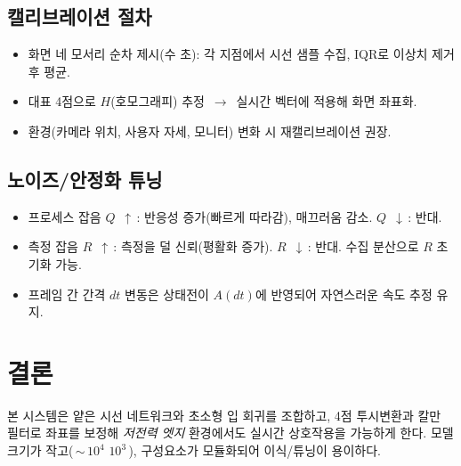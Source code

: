 \documentclass[10pt,a4paper]{article}
\begin{document}
\subsection{캘리브레이션 절차}
\begin{itemize}
  \item 화면 네 모서리 순차 제시(수 초): 각 지점에서 시선 샘플 수집, IQR로 이상치 제거 후 평균.
  \item 대표 4점으로 $H$(호모그래피) 추정 \,$\to$\, 실시간 벡터에 적용해 화면 좌표화.
  \item 환경(카메라 위치, 사용자 자세, 모니터) 변화 시 재캘리브레이션 권장.
\end{itemize}

\subsection{노이즈/안정화 튜닝}
\begin{itemize}
  \item 프로세스 잡음 $Q$ \,$\uparrow$\,: 반응성 증가(빠르게 따라감), 매끄러움 감소. $Q$ \,$\downarrow$\,: 반대.
  \item 측정 잡음 $R$ \,$\uparrow$\,: 측정을 덜 신뢰(평활화 증가). $R$ \,$\downarrow$\,: 반대. 수집 분산으로 $R$ 초기화 가능.
  \item 프레임 간 간격 $dt$ 변동은 상태전이 $A(dt)$에 반영되어 자연스러운 속도 추정 유지.
\end{itemize}

\section{결론}
본 시스템은 얕은 시선 네트워크와 초소형 입 회귀를 조합하고, 4점 투시변환과 칼만 필터로 좌표를 보정해 \emph{저전력 엣지} 환경에서도 실시간 상호작용을 가능하게 한다. 모델 크기가 작고(\,$\sim$\,$10^4$\,\textendash\,$10^3$\,), 구성요소가 모듈화되어 이식/튜닝이 용이하다.
\end{document}
